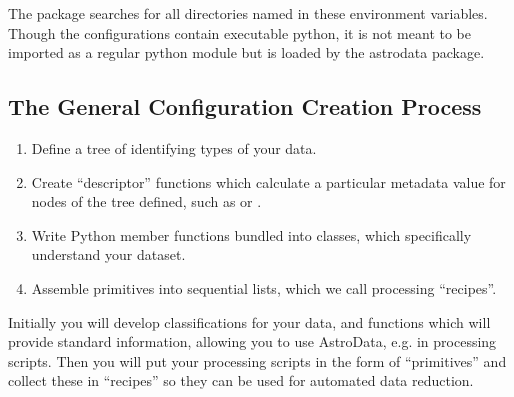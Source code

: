 \documentclass[letterpaper,10pt,english]{sphinxmanual}
\begin{document}
The  package searches for all directories named 
in these environment variables.  Though the configurations contain
executable python, it is not meant to be imported as a regular python module but
is loaded by the astrodata package.


\subsection{The General Configuration Creation Process}
\label{configElements:the-general-configuration-creation-process}\begin{enumerate}
\item {} 
Define a tree of  identifying types of your data.

\item {} 
Create ``descriptor'' functions which calculate a particular metadata
value for nodes of the  tree defined,
such as  or .

\item {} 
Write Python member functions bundled into  classes,
which specifically understand your dataset.

\item {} 
Assemble primitives into sequential lists, which we call  processing
``recipes''.

\end{enumerate}

Initially you will develop classifications
for your data, and functions which will provide standard information, allowing
you to use AstroData, e.g. in processing scripts.  Then you will put your
processing scripts in the form of ``primitives'' and collect these in ``recipes''
so they can be used for automated data reduction.
\end{document}

